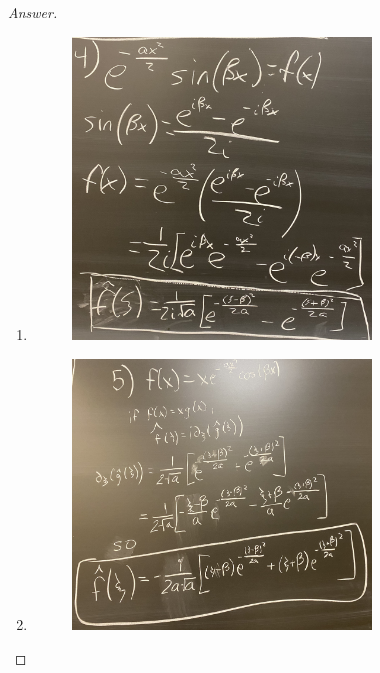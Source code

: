 \documentclass{article}
\theoremstyle{definition}
\renewcommand\qedsymbol{$\blacksquare$}
\newenvironment{ans}{\begin{proof}[Answer]\renewcommand{\qedsymbol}{}}{\end{proof}}
\begin{document}
\begin{ans}
\begin{enumerate}
        \item \phantom{.}
        \begin{figure}[H]
            \centering
            \includegraphics[width = 0.75\textwidth]{Problem 4 Part 4.jpeg}
        \end{figure}

        \item \phantom{.}
        \begin{figure}[H]
            \centering
            \includegraphics[width = 0.75\textwidth]{Problem 4 Part 5.jpeg}
        \end{figure}


\end{enumerate}
\end{ans}
\end{document}
